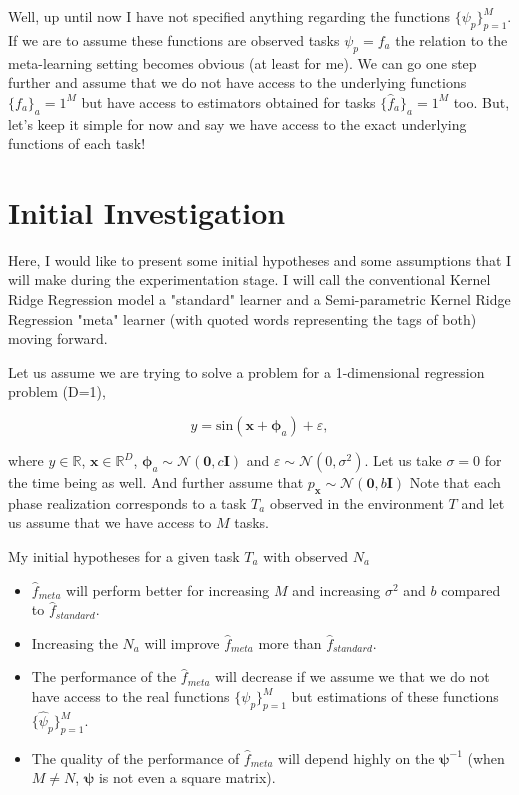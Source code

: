 \documentclass{tran-l}
\theoremstyle{definition}
\theoremstyle{remark}
\numberwithin{equation}{section}
\newcommand{\mR}{\mathbb{R}}
\begin{document}
\rem Well, up until now I have not specified anything regarding the functions $\{\psi_p\}_{p=1}^M$. If we are to assume these functions are observed tasks $\psi_p= f_a$ the relation to the meta-learning setting becomes obvious (at least for me). We can go one step further and assume that we do not have access to the underlying functions $\{f_a\}_a=1^{M}$ but have access to estimators obtained for tasks $\{\hat{f}_a\}_a=1^{M}$ too. But, let's keep it simple for now and say we have access to the exact underlying functions of each task!

\section{Initial Investigation}

Here, I would like to present some initial hypotheses and some assumptions that I will make during the experimentation stage. I will call the conventional Kernel Ridge Regression model a "standard" learner and a Semi-parametric Kernel Ridge Regression "meta" learner (with quoted words representing the tags of both) moving forward.

Let us assume we are trying to solve a problem  for a 1-dimensional regression problem (D=1),

\begin{equation}
  y = \text{sin}(\mathbf{x}+\mathbf{\phi}_{a})+\varepsilon, 
\end{equation}

where $y\in\mR$, $\mathbf{x}\in\mR^D$, $\mathbf{\phi}_{a} \sim \mathcal{N}(\mathbf{0}, c\mathbf{I})$ and $\varepsilon\sim\mathcal{N}(0, \sigma^2)$. Let us take $\sigma=0$ for the time being as well. And further assume that $p_\mathbf{x}\sim\mathcal{N}(\mathbf{0}, b\mathbf{I})$ Note that each phase realization corresponds to a task $T_a$ observed in the environment $T$ and let us assume that we have access to $M$ tasks. 

My initial hypotheses for a given task $T_a$ with observed $N_a$ 
\begin{itemize}
  \item $\hat{f}_{meta}$ will perform better for increasing $M$ and increasing $\sigma^2$ and $b$ compared to $\hat{f}_{standard}$.
  \item Increasing the $N_a$  will improve $\hat{f}_{meta}$ more than $\hat{f}_{standard}$.
  \item The performance of the $\hat{f}_{meta}$ will decrease if we assume we that we do not have access to the real functions $\{\psi_p\}_{p=1}^M$ but estimations of these functions $\{\hat{\psi}_p\}_{p=1}^M$. 
  \item The quality of the performance of $\hat{f}_{meta}$ will depend highly on the $\boldsymbol{\psi}^{-1}$ (when $M\neq N$, $\boldsymbol{\psi}$ is not even a square matrix). 
\end{itemize} 
\end{document}
